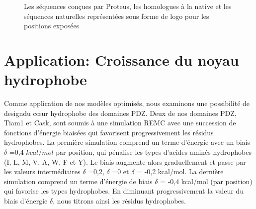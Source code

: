    \begin{figure}[!htbp]
     \caption{Les séquences conçues par Proteus, les homologues à la native et les séquences naturelles représentées sous forme de logo pour les positions exposées}
\label{logo:fullcutPDZ}
   \end{figure}
    
\section{Application: Croissance du noyau hydrophobe}
Comme application de nos modèles optimisés, nous examinons une possibilité de \og design\fg du cœur hydrophobe des domaines PDZ. Deux de nos domaines PDZ, Tiam1 et Cask, sont soumis à une simulation REMC avec une succession de fonctions d'énergie biaisées qui favorisent progressivement les résidus hydrophobes. La première simulation comprend un terme d'énergie avec un biais $\delta$ =0,4 $kcal/mol$ par position, qui pénalise les types d'acides aminés hydrophobes (I, L, M, V, A, W, F et Y). Le biais augmente alors graduellement et passe par les valeurs intermédiaires $\delta$ =0,2, $\delta$ =0 et $\delta$ = -0,2 kcal/mol. La dernière simulation comprend un terme d'énergie de biais $\delta$ = -0,4 kcal/mol (par position) qui favorise les types hydrophobes. En diminuant progressivement la valeur du biais d'énergie $\delta$, nous \og titrons \fg ainsi les résidus hydrophobes.


